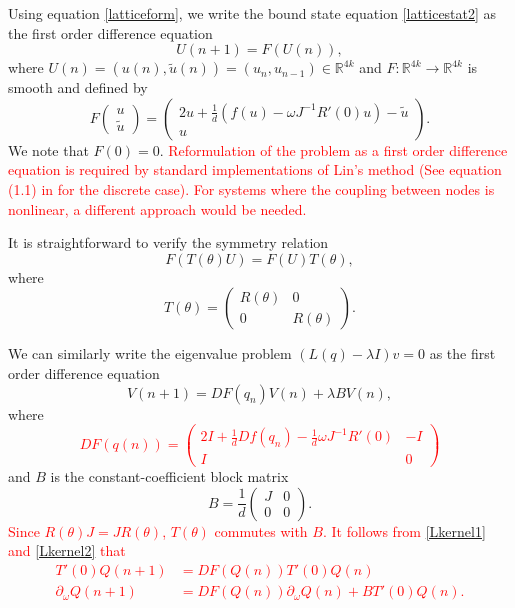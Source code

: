 \documentclass[12pt]{elsarticle}
\def\R{{\mathbb R}}
\newcommand{\revised}[1]{ \textcolor{red}{#1} }
\begin{document}
Using equation \ref{latticeform}, we write the bound state equation \cref{latticestat2} as the first order difference equation
\begin{equation}\label{diffeq}
U(n+1) = F(U(n)),
\end{equation}
where $U(n) = (u(n), \tilde{u}(n)) = (u_n, u_{n-1}) \in \R^{4k}$ and $F: \R^{4k}\rightarrow \R^{4k}$ is smooth and defined by
\begin{equation}\label{latticeF}
F\begin{pmatrix}u \\ \tilde{u} \end{pmatrix} =
\begin{pmatrix}
2 u +\frac{1}{d}\left( f(u) - \omega J^{-1} R'(0) u \right) - \tilde{u} \\
u
\end{pmatrix}.
\end{equation}
We note that $F(0) = 0$. \revised{Reformulation of the problem as a first order difference equation is required by standard implementations of Lin's method (See equation (1.1) in \cite{Knobloch2000} for the discrete case). For systems where the coupling between nodes is nonlinear, a different approach would be needed.}

It is straightforward to verify the symmetry relation 
\begin{equation}
F(T(\theta)U) = F(U)T(\theta),
\end{equation}
where
\begin{equation}
T(\theta) = \begin{pmatrix}
R(\theta) & 0 \\ 0 & R(\theta)
\end{pmatrix}.
\end{equation}

We can similarly write the eigenvalue problem $(L(q) - \lambda I)v = 0$ as the first order difference equation 
\begin{equation}\label{latticeEVP}
V(n+1) = DF(q_n) V(n) + \lambda B V(n),
\end{equation}
where
\revised{
\begin{equation}\label{latticeDF}
DF(q(n)) = 
\begin{pmatrix}
2I + \frac{1}{d}Df(q_n) -\frac{1}{d}\omega J^{-1} R'(0) & -I \\
I & 0
\end{pmatrix} 
\end{equation}
}
and $B$ is the constant-coefficient block matrix
\begin{equation}\label{latticeB}
B = \frac{1}{d} 
\begin{pmatrix}
J & 0 \\
0 & 0 
\end{pmatrix}.
\end{equation}
\revised{
Since $R(\theta)J = J R(\theta)$, $T(\theta)$ commutes with $B$. It follows from \cref{Lkernel1} and \cref{Lkernel2} that
\begin{align}
T'(0) Q(n+1) &= DF(Q(n)) T'(0) Q(n) \label{DFkernel1} \\
\partial_\omega Q(n+1) &= DF(Q(n)) \partial_\omega Q(n) + B T'(0)Q(n) \label{DFkernel2}.
\end{align}
}
\end{document}
